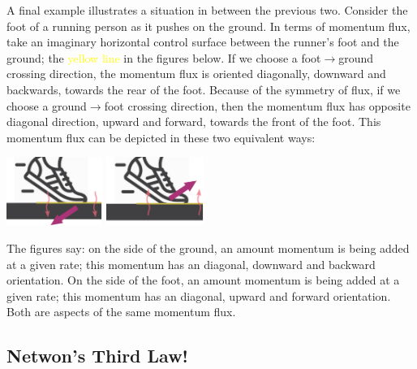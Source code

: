 \documentclass[a4paper,12pt,%
onecolumn,oneside,%
british%
]{memoir}
\renewcommand*{\|}[1][]{\nonscript\:#1\vert\nonscript\:\mathopen{}}
\begin{document}
A final example illustrates a situation in between the previous two. Consider the foot of a running person as it pushes on the ground. In terms of momentum flux, take an imaginary horizontal control surface between the runner's foot and the ground; the \textcolor{yellow}{yellow line} in the figures below. If we choose a foot$\rightarrow$ground crossing direction, the momentum flux is oriented diagonally, downward and backwards, towards the rear of the foot. Because of the symmetry of flux, if we choose a ground$\rightarrow$foot crossing direction, then the momentum flux has opposite diagonal direction, upward and forward, towards the front of the foot. This momentum flux can be depicted in these two equivalent ways:\noprelistbreak
\begin{center}
  \medskip
\hspace*{\fill}
  \includegraphics[height=6em]{images/foot_shear_flux_down.pdf}
\hfill
  \includegraphics[height=6em]{images/foot_shear_flux_up.pdf}
\hspace*{\fill}
\end{center}
The figures say: on the side of the ground, an amount momentum is being added at a given rate; this momentum has an diagonal, downward and backward orientation. On the side of the foot, an amount momentum is being added at a given rate; this momentum has an diagonal, upward and forward orientation. Both are aspects of the same momentum flux.

\subsection{Netwon's Third Law!}
\label{sec:newton_3rd}
\end{document}
